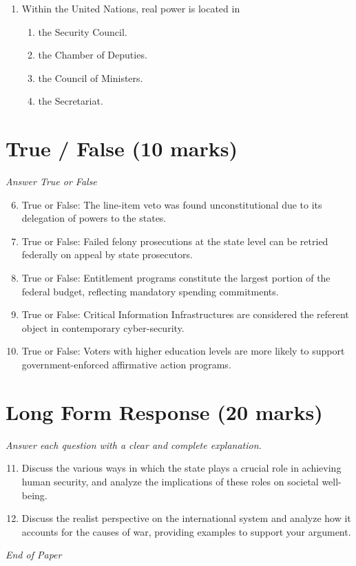 \documentclass[12pt]{article}
\begin{document}
\begin{enumerate}[label=\arabic*.]
\begin{enumerate}[label=(\alph*)]
    \item Idealism
    \item Liberalism
    \item None of the above
\end{enumerate}
\item Within the United Nations, real power is located in
\begin{enumerate}[label=(\alph*)]
    \item the Security Council.
    \item the Chamber of Deputies.
    \item the Council of Ministers.
    \item the Secretariat.
\end{enumerate}
\end{enumerate}

\section*{True / False (10 marks)}
\textit{Answer True or False}
\begin{enumerate}[label=\arabic*.]
\setcounter{enumi}{5}
\item True or False: The line-item veto was found unconstitutional due to its delegation of powers to the states.
\item True or False: Failed felony prosecutions at the state level can be retried federally on appeal by state prosecutors.
\item True or False: Entitlement programs constitute the largest portion of the federal budget, reflecting mandatory spending commitments.
\item True or False: Critical Information Infrastructures are considered the referent object in contemporary cyber-security.
\item True or False: Voters with higher education levels are more likely to support government-enforced affirmative action programs.
\end{enumerate}

\section*{Long Form Response (20 marks)}
\textit{Answer each question with a clear and complete explanation.}
\begin{enumerate}[label=\arabic*.]
\setcounter{enumi}{10}
\item Discuss the various ways in which the state plays a crucial role in achieving human security, and analyze the implications of these roles on societal well-being.
\item Discuss the realist perspective on the international system and analyze how it accounts for the causes of war, providing examples to support your argument.
\end{enumerate}

\vfill
\noindent\textit{End of Paper}
\end{document}
